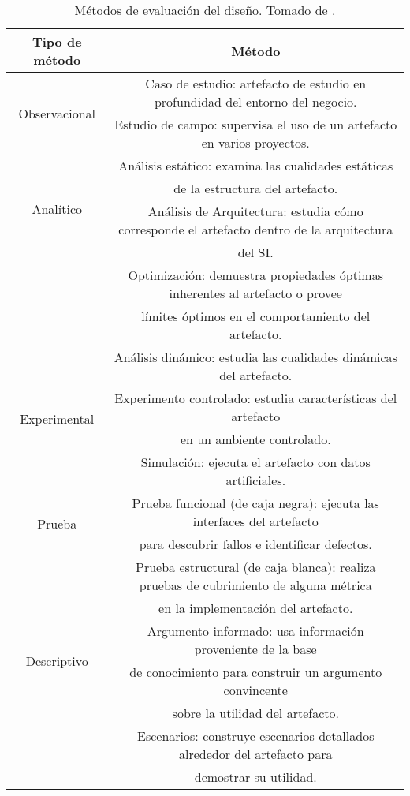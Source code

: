 \begin{table}
\begin{tabular}{|c|c|}
\hline 
Tipo de método & Método \\
\hline
\multirow{2}{*}{Observacional}& Caso de estudio: artefacto de estudio en profundidad del entorno del negocio.\\
& Estudio de campo: supervisa el uso de un artefacto en varios proyectos. \\
\hline 
\multirow{4}{*}{Analítico}& Análisis estático: examina las cualidades estáticas \\
& de la estructura del artefacto. \\
& Análisis de Arquitectura: estudia cómo corresponde el artefacto dentro de la arquitectura \\
& del SI.\\
& Optimización: demuestra propiedades óptimas inherentes al artefacto o provee  \\
& límites óptimos en el comportamiento del artefacto.\\
& Análisis dinámico: estudia las cualidades dinámicas del artefacto.\\
\hline 
\multirow{2}{*}{Experimental}& Experimento controlado: estudia características del artefacto\\
& en un ambiente controlado. \\
& Simulación: ejecuta el artefacto con datos artificiales. \\
\hline
\multirow{2}{*}{Prueba}& Prueba funcional (de caja negra): ejecuta las interfaces del artefacto\\
& para descubrir fallos e identificar defectos. \\
& Prueba estructural (de caja blanca): realiza pruebas de cubrimiento de alguna métrica \\
& en la implementación del artefacto. \\
\hline
\multirow{2}{*}{Descriptivo}& Argumento informado: usa información proveniente de la base\\
& de conocimiento para construir un argumento convincente \\
& sobre la utilidad del artefacto. \\
& Escenarios: construye escenarios detallados alrededor del artefacto para \\
& demostrar su utilidad. \\
\hline
\end{tabular} 
\caption{Métodos de evaluación del diseño. Tomado de \citep{Hevner:2004:DSI:2017212.2017217}.}
\label{tab: evaluacion}
\end{table}


